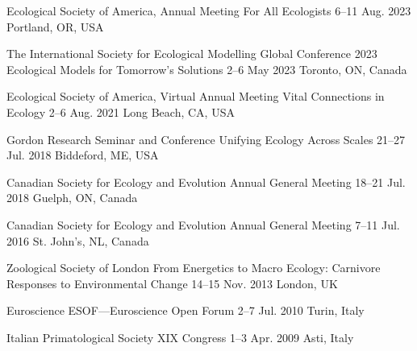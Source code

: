 \begin{cventries}

  \cventry
    {Ecological Society of America, Annual Meeting} %
    {For All Ecologists} %
    {6--11 Aug. 2023} %
    {Portland, OR, USA} %
    {
    }

  \cventry
    {The International Society for Ecological Modelling Global Conference 2023} %
    {Ecological Models for Tomorrow's Solutions} %
    {2--6 May 2023} %
    {Toronto, ON, Canada} %
    {
    }

  \cventry
    {Ecological Society of America, Virtual Annual Meeting} %
    {Vital Connections in Ecology} %
    {2--6 Aug. 2021} %
    {Long Beach, CA, USA} %
    {
    }

  \cventry
    {Gordon Research Seminar and Conference} %
    {Unifying Ecology Across Scales} %
    {21--27 Jul. 2018} %
    {Biddeford, ME, USA} %
    {
    }

  \cventry
    {Canadian Society for Ecology and Evolution} %
    {Annual General Meeting} %
    {18--21 Jul. 2018} %
    {Guelph, ON, Canada} %
    {
    }

  \cventry
    {Canadian Society for Ecology and Evolution} %
    {Annual General Meeting} %
    {7--11 Jul. 2016} %
    {St. John's, NL, Canada} %
    {
    }

  \cventry
    {Zoological Society of London} %
    {From Energetics to Macro Ecology: Carnivore Responses to Environmental Change} %
    {14--15 Nov. 2013} %
    {London, UK} %
    {
    }

  \cventry
    {Euroscience} %
    {ESOF---Euroscience Open Forum} %
    {2--7 Jul. 2010} %
    {Turin, Italy} %
    {
    }

  \cventry
    {Italian Primatological Society} %
    {XIX Congress} %
    {1--3 Apr. 2009} %
    {Asti, Italy} %
    {
    }

\end{cventries}

